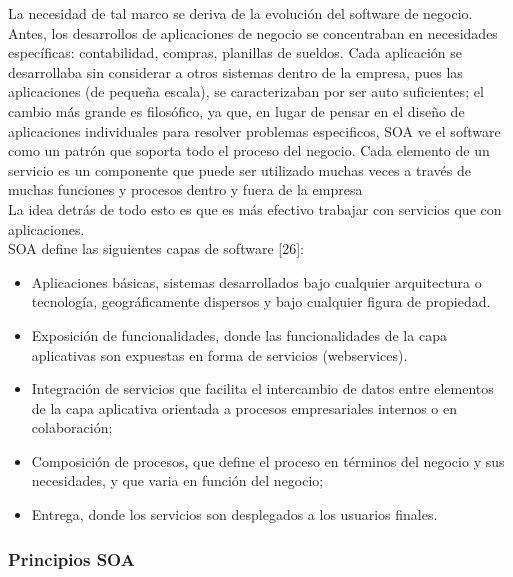 La necesidad de tal marco se deriva de la evolución del software de negocio. Antes, los desarrollos de aplicaciones de negocio se 
concentraban en necesidades específicas: contabilidad, compras, planillas de sueldos. Cada aplicación se desarrollaba sin considerar a 
otros sistemas dentro de la empresa, pues las aplicaciones (de pequeña escala), se caracterizaban por ser auto suficientes; el cambio 
más grande es filosófico, ya que, en lugar de pensar en el diseño de aplicaciones individuales para resolver problemas especificos, 
SOA ve el software como un patrón que soporta todo el proceso del negocio. Cada elemento de un servicio es un componente que puede 
ser utilizado muchas veces a través de muchas funciones y procesos dentro y fuera de la empresa\\

La idea detrás de todo esto es que es más efectivo trabajar con servicios que con aplicaciones.\\

SOA define las siguientes capas de software [26]:
\begin{itemize}
 \item Aplicaciones básicas, sistemas desarrollados bajo cualquier arquitectura o tecnología, geográficamente dispersos y bajo 
  cualquier figura de propiedad.
 \item Exposición de funcionalidades, donde las funcionalidades de la capa aplicativas son expuestas en forma de servicios (webservices).
 \item Integración de servicios que facilita el intercambio de datos entre elementos de la capa aplicativa orientada a procesos 
  empresariales internos o en colaboración;
 \item Composición de procesos, que define el proceso en términos del negocio y sus necesidades, y que varia en función del negocio;
 \item Entrega, donde los servicios son desplegados a los usuarios finales.
\end{itemize}

\subsubsection{Principios  SOA}

